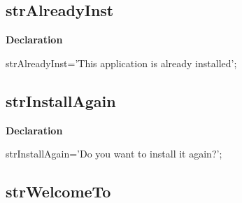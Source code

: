 \documentclass{report}
\newif\ifpdf
\begin{document}
\subsection*{strAlreadyInst}
\fi
\label{trstrings-strAlreadyInst}
\begin{list}{}{
\setlength{\itemindent}{0cm}
\setlength{\listparindent}{0cm}
\setlength{\leftmargin}{\evensidemargin}
\addtolength{\leftmargin}{\tmplength}
\settowidth{\labelsep}{X}
\addtolength{\leftmargin}{\labelsep}
\setlength{\labelwidth}{\tmplength}
}
\item[\textbf{Declaration}\hfill]
\ifpdf
\begin{flushleft}
\fi
\begin{ttfamily}
strAlreadyInst='This application is already installed';\end{ttfamily}

\ifpdf
\end{flushleft}
\fi

\end{list}
\ifpdf
\subsection*{\large{\textbf{strInstallAgain}}\normalsize\hspace{1ex}\hrulefill}
\else
\subsection*{strInstallAgain}
\fi
\label{trstrings-strInstallAgain}
\begin{list}{}{
\setlength{\itemindent}{0cm}
\setlength{\listparindent}{0cm}
\setlength{\leftmargin}{\evensidemargin}
\addtolength{\leftmargin}{\tmplength}
\settowidth{\labelsep}{X}
\addtolength{\leftmargin}{\labelsep}
\setlength{\labelwidth}{\tmplength}
}
\item[\textbf{Declaration}\hfill]
\ifpdf
\begin{flushleft}
\fi
\begin{ttfamily}
strInstallAgain='Do you want to install it again?';\end{ttfamily}

\ifpdf
\end{flushleft}
\fi

\end{list}
\ifpdf
\subsection*{\large{\textbf{strWelcomeTo}}\normalsize\hspace{1ex}\hrulefill}
\else
\end{document}
